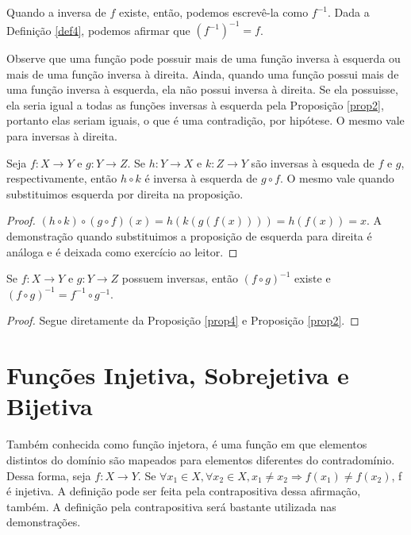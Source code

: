 Quando a inversa de $f$ existe, então, podemos escrevê-la como $f^{-1}$. Dada a Definição \ref{def4}, 
podemos afirmar que $(f^{-1})^{-1} = f$.  

Observe que uma função pode possuir mais de uma função inversa à esquerda ou mais de uma função inversa 
à direita. Ainda, quando uma função possui mais de uma função inversa à esquerda, ela não possui inversa 
à direita. Se ela possuisse, ela seria igual a todas as funções inversas à esquerda pela Proposição \ref{prop2}, 
portanto elas seriam iguais, o que é uma contradição, por hipótese. O mesmo vale para inversas à direita. 

\begin{theorem}
     \label{prop4}
     Seja $f: X \to Y $ e $g: Y \to Z$. Se $h: Y \to X$ e $k: Z \to Y$ são inversas à esqueda de $f$ e $g$, 
     respectivamente, então $h \circ k$ é inversa à esquerda de $g \circ f$. O mesmo vale quando substituimos
     esquerda por direita na proposição. 
\end{theorem}

\begin{proof}
 $(h \circ k)\circ(g \circ f)(x) = h(k(g(f(x)))) = h(f(x)) = x $. A demonstração quando substituimos a proposição
 de esquerda para direita é análoga e é deixada como exercício ao leitor.
\end{proof}

\begin{corollary}
    \label{cor1}
    Se $f: X \to Y$ e $g: Y \to Z$ possuem inversas, então $(f \circ g)^{-1}$ existe e 
    $(f \circ g)^{-1} = f^{-1} \circ g^{-1}$.
\end{corollary}

\begin{proof}
    Segue diretamente da Proposição \ref{prop4} e Proposição \ref{prop2}.  
\end{proof}

\section{Funções Injetiva, Sobrejetiva e Bijetiva}

\begin{definition}
    \label{def5}
    Também conhecida como função injetora, é uma função em que elementos distintos do domínio são 
    mapeados para elementos diferentes do contradomínio. Dessa forma, seja $f: X \to Y$. Se 
    $\forall x_1 \in X, \forall x_2 \in X, x_1 \neq x_2 \Rightarrow f(x_1) \neq f(x_2) $, f é injetiva. 
    A definição pode ser feita pela contrapositiva dessa afirmação, também. A definição pela contrapositiva
    será bastante utilizada nas demonstrações. 
\end{definition}

